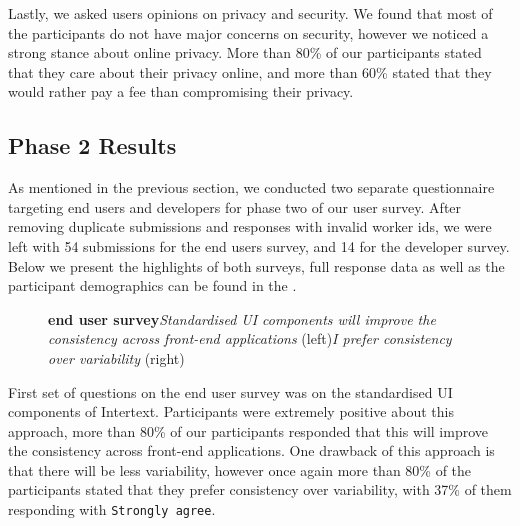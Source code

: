 Lastly, we asked users opinions on privacy and security. We found that most of the participants do not have major concerns on security, however we noticed a strong stance about online privacy. More than 80\% of our participants stated that they care about their privacy online, and more than 60\% stated that they would rather pay a fee than compromising their privacy.


\subsection{Phase 2 Results}

As mentioned in the previous section, we conducted two separate questionnaire targeting end users and developers for phase two of our user survey. After removing duplicate submissions and responses with invalid worker ids, we were left with 54 submissions for the end users survey, and 14 for the developer survey. Below we present the highlights of both surveys, full response data as well as the participant demographics can be found in the .


\begin{figure}[H]
\centering
{}
\vspace*{-5mm}
\caption{\textbf{end user survey}\newline\textit{Standardised UI components will improve the consistency across front-end applications} (left)\newline\textit{I prefer consistency over variability} (right)} \label{fig:ev_p2_1}
\end{figure}

First set of questions on the end user survey was on the standardised UI components of Intertext. Participants were extremely positive about this approach, more than 80\% of our participants responded that this will improve the consistency across front-end applications. One drawback of this approach is that there will be less variability, however once again more than 80\% of the participants stated that they prefer consistency over variability, with 37\% of them responding with \texttt{Strongly agree}.

